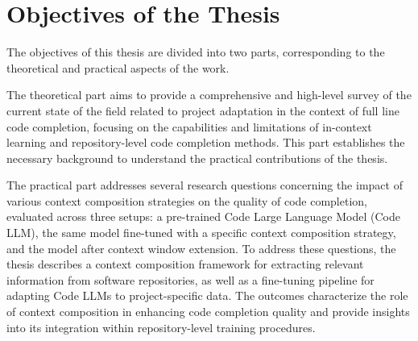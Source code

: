 \chapter*{Objectives of the Thesis}

The objectives of this thesis are divided into two parts, corresponding to the theoretical and practical aspects of the work.

The theoretical part aims to provide a comprehensive and high-level survey of the current state of the field related to project adaptation in the context of full line code completion, focusing on the capabilities and limitations of in-context learning and repository-level code completion methods. This part establishes the necessary background to understand the practical contributions of the thesis.

The practical part addresses several research questions concerning the impact of various context composition strategies on the quality of code completion, evaluated across three setups: a pre-trained Code Large Language Model (Code LLM), the same model fine-tuned with a specific context composition strategy, and the model after context window extension. To address these questions, the thesis describes a context composition framework for extracting relevant information from software repositories, as well as a fine-tuning pipeline for adapting Code LLMs to project-specific data. The outcomes characterize the role of context composition in enhancing code completion quality and provide insights into its integration within repository-level training procedures.
